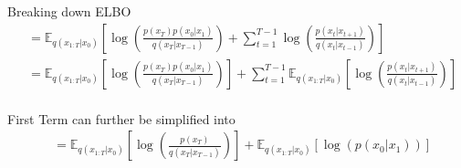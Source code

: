\begin{frame}{Breaking down ELBO}
    \begin{align*}
        &= \mathbb{E}_{q(x_{1:T}|x_0)} \left[ \log \left( \frac{p(x_T)p(x_0|x_1)}{q(x_T|x_{T-1})} \right) + \sum_{t=1}^{T-1} \log \left( \frac{p(x_{t}|x_{t+1})}{q(x_t|x_{t-1})} \right) \right] \\
        &= \mathbb{E}_{q(x_{1:T}|x_0)} \left[ \log \left( \frac{p(x_T)p(x_0|x_1)}{q(x_T|x_{T-1})} \right) \right] + \sum_{t=1}^{T-1} \mathbb{E}_{q(x_{1:T}|x_0)} \left[ \log \left( \frac{p(x_{t}|x_{t+1})}{q(x_t|x_{t-1})} \right) \right] \\
    \end{align*}

    First Term can further be simplified into
    \begin{align*}
        &= \mathbb{E}_{q(x_{1:T}|x_0)} \left[ \log \left( \frac{p(x_T)}{q(x_T|x_{T-1})} \right) \right] + \mathbb{E}_{q(x_{1:T}|x_0)} \left[ \log \left( p(x_0|x_1) \right) \right] \\
    \end{align*}
\end{frame}